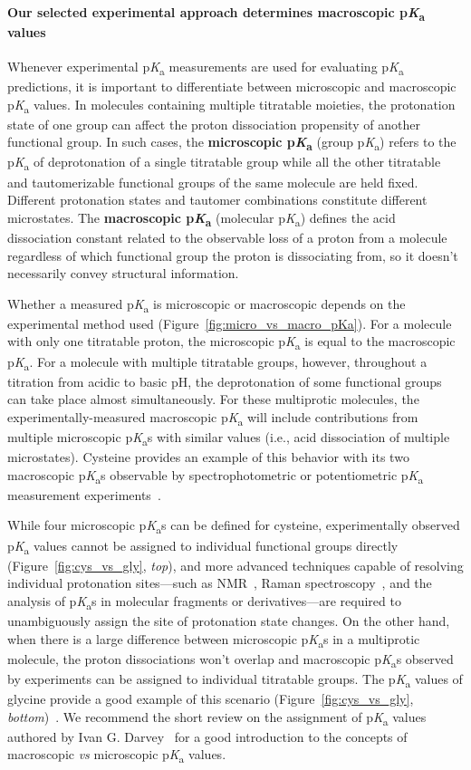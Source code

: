\documentclass[9pt,lineno]{elife}
\newcommand{\pKa}{p\textit{K}\textsubscript{a}}
\begin{document}
\paragraph{Our selected experimental approach determines macroscopic \pKa{} values}

Whenever experimental \pKa{} measurements are used for evaluating \pKa{} predictions, it is important to differentiate between microscopic and macroscopic \pKa{} values. 
In molecules containing multiple titratable moieties, the protonation state of one group can affect the proton dissociation propensity of another functional group.
In such cases, the \textbf{microscopic \pKa} (group \pKa) refers to the \pKa{} of deprotonation of a single titratable group while all the other titratable and tautomerizable functional groups of the same molecule are held fixed. 
Different protonation states and tautomer combinations constitute different microstates. 
The \textbf{macroscopic \pKa} (molecular \pKa) defines the acid dissociation constant related to the observable loss of a proton from a molecule regardless of which functional group the proton is dissociating from, so it doesn't necessarily convey structural information. 

Whether a measured \pKa{} is microscopic or macroscopic depends on the experimental method used (Figure~\ref{fig:micro_vs_macro_pKa}). 
For a molecule with only one titratable proton, the microscopic \pKa{} is equal to the macroscopic \pKa{}. 
For a molecule with multiple titratable groups, however, throughout a titration from acidic to basic pH, the deprotonation of some functional groups can take place almost simultaneously. 
For these multiprotic molecules, the experimentally-measured macroscopic \pKa{} will include contributions from multiple microscopic \pKa{}s with similar values (i.e., acid dissociation of multiple microstates). 
Cysteine provides an example of this behavior with its two macroscopic \pKa{}s observable by spectrophotometric or potentiometric \pKa{} measurement experiments~\citep{bodner_assigning_1986,darvey_assignment_1995}. 

While four microscopic \pKa{}s can be defined for cysteine, experimentally observed \pKa{} values cannot be assigned to individual functional groups directly (Figure~\ref{fig:cys_vs_gly}, \emph{top}), and more advanced techniques capable of resolving individual protonation sites---such as NMR~\citep{bezencon_pka_2014}, Raman spectroscopy~\citep{elson_raman_1962, elbagerma_raman_2011}, and the analysis of \pKa{}s in molecular fragments or derivatives---are required to unambiguously assign the site of protonation state changes. 
On the other hand, when there is a large difference between microscopic \pKa{}s in a multiprotic molecule, the proton dissociations won't overlap and macroscopic \pKa{}s observed by experiments can be assigned to individual titratable groups. 
The \pKa{} values of glycine provide a good example of this scenario (Figure~\ref{fig:cys_vs_gly}, \emph{bottom})~\citep{bodner_assigning_1986,elson_raman_1962,darvey_assignment_1995}. 
We recommend the short review on the assignment of \pKa{} values authored by Ivan G. Darvey~\citep{darvey_assignment_1995} for a good introduction to the concepts of macroscopic \emph{vs} microscopic \pKa{} values.
\end{document}
